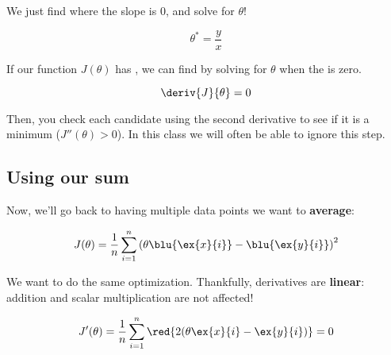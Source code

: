         We just find where the slope is 0, and solve for $\theta$!
        
        \begin{equation}
            \theta^* = \frac{y}{x}
        \end{equation}
        
        \begin{concept}
            
            If our function $J(\theta)$ has , we can  find  by solving for $\theta$ when the  is zero.
            
            \begin{equation*}
                \deriv{J}{\theta}=0
            \end{equation*}
            
            Then, you check each candidate using the second derivative to see if it is a minimum ($J''(\theta)>0$). In this class we will often be able to ignore this step.
        \end{concept}
        
        
    \subsection*{Using our sum}
    
        Now, we'll go back to having multiple data points we want to \textbf{average}:
        
        \begin{equation}
            J(\theta) = \frac{1}{n}  \sum_{i=1}^n 
            \left( \theta \blu{\ex{x}{i}}  
            - \blu{\ex{y}{i}} \right)^2 
        \end{equation}
        
        We want to do the same optimization. Thankfully, derivatives are \textbf{linear}: addition and scalar multiplication are not affected!
        
        \begin{equation}
            J'(\theta) = \frac{1}{n}  \sum_{i=1}^n \red{2(\theta \ex{x}{i}  
            - \ex{y}{i} )} = 0
        \end{equation}
        
